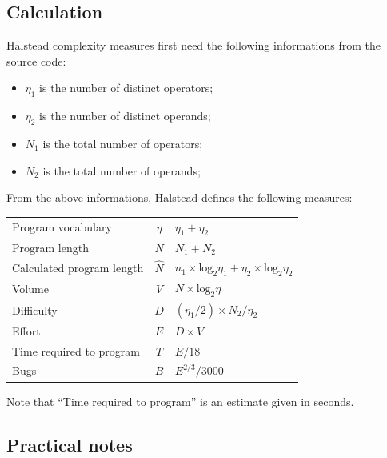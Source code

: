 \documentclass{frama-c-book}
\begin{document}
\subsection{Calculation}
\label{sec:halstead_computation}

Halstead complexity measures first need the following informations from the
source code:
\begin{itemize}
\item $\eta_{1}$ is the number of distinct operators;
\item $\eta_{2}$ is the number of distinct operands;
\item $N_{1}$ is the total number of operators;
\item $N_{2}$ is the total number of operands;
\end{itemize}

From the above informations, Halstead defines the following measures:
\begin{center}
  \begin{tabular}{lcl}
    Program vocabulary        &  $\eta$     & $\eta_{1} + \eta_{2}$ \\
    Program length            &  $N$       & $N_{1} + N_{2}$ \\
    Calculated program length &  $\hat{N}$
                              &  $n_{1} \times \text{log}_{2} \eta_{1} +
                                \eta_{2} \times \text{log}_{2}\eta_{2}$
                              \\
    Volume                    &  $V$        & $N \times \text{log}_{2} \eta$ \\
    Difficulty                &  $D$        & $(\eta_{1} / 2) \times N_{2} / \eta_{2}$ \\
    Effort                    &  $E$        & $D \times V $ \\
    Time required to program  &  $T$        & $E / 18$ \\
    Bugs                      &  $B$        & $E^{2/3} / 3000$ \\
  \end{tabular}
\end{center}

Note that ``Time required to program'' is an estimate given in seconds.

\subsection{Practical notes}
\label{sec:plug-functionalities}
\end{document}
